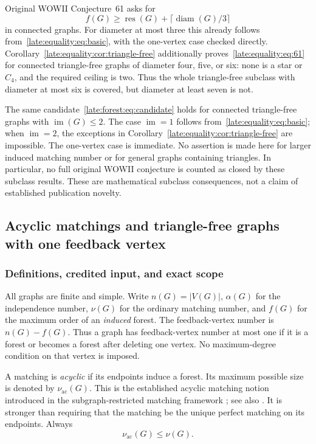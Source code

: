 \documentclass[11pt,a4paper]{article}
\theoremstyle{definition}\newtheorem{definition}[theorem]{Definition}
\theoremstyle{remark}\newtheorem{remark}[theorem]{Remark}
\newcommand{\res}{\operatorname{res}}
\newcommand{\im}{\operatorname{im}}
\begin{document}
Original WOWII Conjecture~61 asks for
\begin{equation}\label{late:equality:eq:61}
 f(G)\ge\res(G)+\lceil\operatorname{diam}(G)/3\rceil
\end{equation}
in connected graphs. For diameter at most three this already follows
from~\eqref{late:equality:eq:basic}, with the one-vertex case checked directly.
Corollary~\ref{late:equality:cor:triangle-free} additionally proves~\eqref{late:equality:eq:61} for connected
triangle-free graphs of diameter four, five, or six: none is a star or $C_4$,
and the required ceiling is two. Thus the whole triangle-free subclass with
diameter at most six is covered, but diameter at least seven is not.

The same candidate~\eqref{late:forest:eq:candidate}
holds for connected triangle-free graphs with $\im(G)\le2$. The case
$\im=1$ follows from~\eqref{late:equality:eq:basic}; when $\im=2$, the exceptions in
Corollary~\ref{late:equality:cor:triangle-free} are impossible. The one-vertex case is immediate.
No assertion is made here for larger induced matching number or for
general graphs containing triangles. In particular, no full original WOWII conjecture is
counted as closed by these subclass results. These are mathematical subclass
consequences, not a claim of established publication novelty.


\subsection{Acyclic matchings and triangle-free graphs with one feedback vertex}\label{late:apex}

\subsubsection{Definitions, credited input, and exact scope}
All graphs are finite and simple. Write $n(G)=|V(G)|$, $\alpha(G)$ for the
independence number, $\nu(G)$ for the ordinary matching number, and $f(G)$
for the maximum order of an \emph{induced} forest. The feedback-vertex
number is $n(G)-f(G)$. Thus a graph has feedback-vertex number at most one
if it is a forest or becomes a forest after deleting one vertex.
No maximum-degree condition on that vertex is imposed.

A matching is \emph{acyclic} if its endpoints induce a forest. Its maximum
possible size is denoted by $\nu_{\mathrm{ac}}(G)$. This is the established acyclic
matching notion introduced in the subgraph-restricted matching framework
\cite{late:apex:GHHL}; see also \cite{late:apex:BR}. It is stronger than requiring that the
matching be the unique perfect matching on its endpoints. Always
\begin{equation}\label{late:apex:eq:acnu}
 \nu_{\mathrm{ac}}(G)\le\nu(G).
\end{equation}
\end{document}
